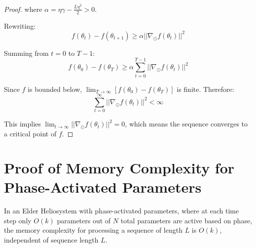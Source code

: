\begin{proof}
where $\alpha = \eta\gamma - \frac{L\eta^2}{2} > 0$.

Rewriting:
\begin{equation}
f(\theta_t) - f(\theta_{t+1}) \geq \alpha ||\nabla_{\odot} f(\theta_t)||^2
\end{equation}

Summing from $t=0$ to $T-1$:
\begin{equation}
f(\theta_0) - f(\theta_T) \geq \alpha \sum_{t=0}^{T-1} ||\nabla_{\odot} f(\theta_t)||^2
\end{equation}

Since $f$ is bounded below, $\lim_{T \to \infty} [f(\theta_0) - f(\theta_T)]$ is finite. Therefore:
\begin{equation}
\sum_{t=0}^{\infty} ||\nabla_{\odot} f(\theta_t)||^2 < \infty
\end{equation}

This implies $\lim_{t \to \infty} ||\nabla_{\odot} f(\theta_t)||^2 = 0$, which means the sequence converges to a critical point of $f$.
\end{proof}

\section{Proof of Memory Complexity for Phase-Activated Parameters}

\begin{theorem}
In an Elder Heliosystem with phase-activated parameters, where at each time step only $O(k)$ parameters out of $N$ total parameters are active based on phase, the memory complexity for processing a sequence of length $L$ is $O(k)$, independent of sequence length $L$.
\end{theorem}

